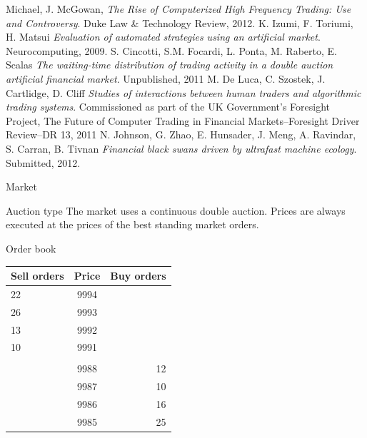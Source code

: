 \documentclass[14pt]{beamer}
\begin{document}










\begin{thebibliography}{Bib}

  Michael, J. McGowan,
  \emph{The Rise of Computerized High Frequency Trading: Use and Controversy}.
  Duke Law \& Technology Review,
  2012.
  K. Izumi, F. Toriumi, H. Matsui
  \emph{Evaluation of automated strategies using an artificial market}.
  Neurocomputing,
  2009.
  S. Cincotti, S.M. Focardi, L. Ponta, M. Raberto, E. Scalas
  \emph{The waiting-time distribution of trading activity in a double auction artificial financial market}. Unpublished, 2011
  M. De Luca, C. Szostek, J. Cartlidge, D. Cliff
  \emph{Studies of interactions between human traders and algorithmic trading systems}.
  Commissioned as part of the UK {Government's} Foresight Project, The Future of Computer Trading in Financial Markets--Foresight Driver Review--DR 13, 2011
  N. Johnson, G. Zhao, E. Hunsader, J. Meng, A. Ravindar, S. Carran, B. Tivnan
  \emph{Financial black swans driven by ultrafast machine ecology}.
  Submitted, 2012.
   

\end{thebibliography}

\begin{frame}{Market}
\begin{block}{Auction type}
The market uses a continuous double auction. Prices are always executed at the prices of the best standing market orders.
\end{block}
\end{frame}


\begin{frame}{Order book}
\begin{table}
\centering
\begin{tabular}{l|c|r}
Sell orders & Price & Buy orders\\
\midrule
22 & 9994 &\\
26 & 9993 &\\
13 & 9992 &\\
10 & 9991 &\\ 
{}&{}&{}\\
& 9988& 12\\
& 9987& 10\\
& 9986& 16\\
& 9985& 25\\
\end{tabular}
\end{table}
\end{frame}
\end{document}
